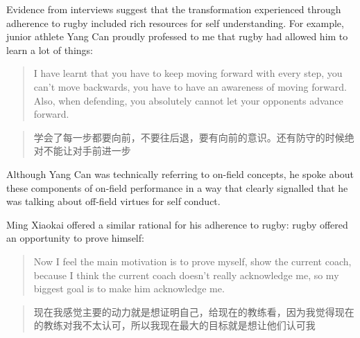 \begin{CJK}{UTF8}{gbsn}
Evidence from interviews suggest that the transformation experienced through adherence to rugby included rich resources for self understanding.  For example, junior athlete Yang Can proudly professed to me that rugby had allowed him to learn a lot of things:

\begin{quote}
    I have learnt that you have to keep moving forward with every step, you can’t move backwards, you have to have an awareness of moving forward.  Also, when defending, you absolutely cannot let your opponents advance forward.
\end{quote}

\begin{quote}
    学会了每一步都要向前，不要往后退，要有向前的意识。还有防守的时候绝对不能让对手前进一步
\end{quote}

Although Yang Can was technically referring to on-field concepts, he spoke about these components of on-field performance in a way that clearly signalled that he was talking about off-field virtues for self conduct.

Ming Xiaokai offered a similar rational for his adherence to rugby: rugby offered an opportunity to prove himself:

  \begin{quote}
    Now I feel the main motivation is to prove myself, show the current coach, because I think the current coach doesn't really acknowledge me, so my biggest goal is to make him acknowledge me.
  \end{quote}

  \begin{quote}
    现在我感觉主要的动力就是想证明自己，给现在的教练看，因为我觉得现在的教练对我不太认可，所以我现在最大的目标就是想让他们认可我
  \end{quote}



\end{CJK}
